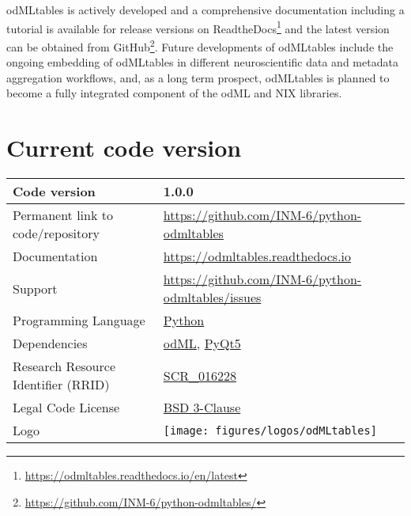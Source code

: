 odMLtables is actively developed and a comprehensive documentation including a tutorial is available for release versions on ReadtheDocs\footnote{\url{https://odmltables.readthedocs.io/en/latest}} and the latest version can be obtained from GitHub\footnote{\url{https://github.com/INM-6/python-odmltables/}}. Future developments of odMLtables include the ongoing embedding of odMLtables in different neuroscientific data and metadata aggregation workflows, and, as a long term prospect, odMLtables is planned to become a fully integrated component of the odML and NIX libraries.


\section{Current code version}
\label{sec:code_version}

\begin{tabular}{ll}
\hline
Code version & 1.0.0 \\
\hline
Permanent link to code/repository & \href{https://github.com/INM-6/python-odmltables}{https://github.com/INM-6/python-odmltables}\\
\hline
Documentation & \href{https://odmltables.readthedocs.io}{https://odmltables.readthedocs.io}\\
\hline
Support & \href{https://github.com/INM-6/python-odmltables/issues}{https://github.com/INM-6/python-odmltables/issues}\\
\hline
Programming Language & \href{https://www.python.org/}{Python}\\
\hline
Dependencies & \href{http://g-node.github.io/python-odml/}{odML}, \href{https://wiki.python.org/moin/PyQt}{PyQt5}\\  
\hline
Research Resource Identifier (RRID) & \href{https://scicrunch.org/scicrunch/Resources/record/nlx_144509-1/SCR_016228/resolver}{SCR\_016228}\\
\hline
Legal Code License  & \href{https://github.com/INM-6/python-odmltables/blob/master/LICENSE.txt}{BSD 3-Clause} \\
\hline
Logo &
\texttt{[image: figures/logos/odMLtables]}\\
\hline
\end{tabular}


